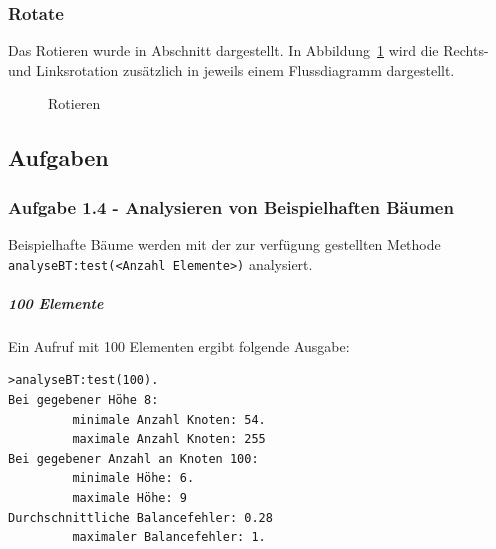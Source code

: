 \subsubsection{Rotate}\label{par:MethodRotate}
Das Rotieren wurde in Abschnitt  dargestellt.
In Abbildung~\ref{fig:rotate} wird die Rechts- und Linksrotation zusätzlich in jeweils einem
Flussdiagramm dargestellt.
\begin{figure}[hbtp]
    \centering
    \caption{Rotieren}
    \label{fig:rotate}
\end{figure}

\FloatBarrier
\subsection{Aufgaben}\label{subsec:aufgaben}

\subsubsection{Aufgabe 1.4 - Analysieren von Beispielhaften Bäumen}
Beispielhafte Bäume werden mit der zur verfügung gestellten Methode\\
\verb|analyseBT:test(<Anzahl Elemente>)| analysiert.
\subparagraph{100 Elemente}
Ein Aufruf mit 100 Elementen ergibt folgende Ausgabe:
\begin{verbatim}
>analyseBT:test(100).
Bei gegebener Höhe 8:
         minimale Anzahl Knoten: 54.
         maximale Anzahl Knoten: 255
Bei gegebener Anzahl an Knoten 100:
         minimale Höhe: 6.
         maximale Höhe: 9
Durchschnittliche Balancefehler: 0.28
         maximaler Balancefehler: 1.
\end{verbatim}

